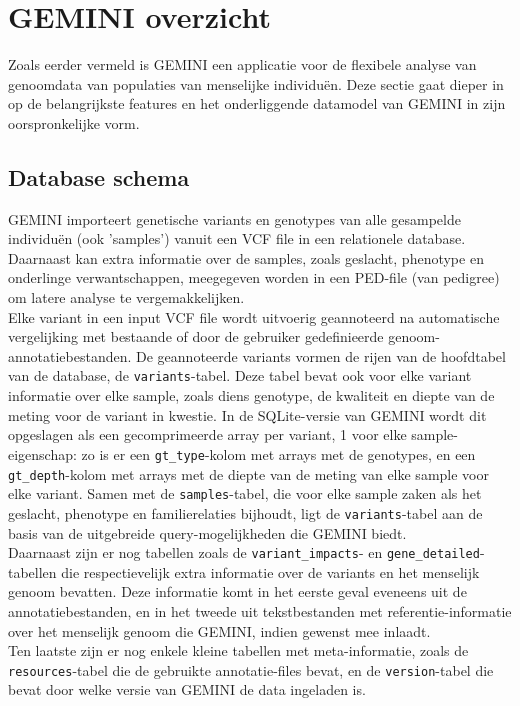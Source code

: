 \chapter{GEMINI overzicht}
\label{gemini_beschrijving}

Zoals eerder vermeld is GEMINI een applicatie voor de flexibele analyse van genoomdata van populaties van menselijke individu\"en. Deze sectie gaat dieper in op de belangrijkste features en het onderliggende datamodel van GEMINI in zijn oorspronkelijke vorm.\cite{10.1371/journal.pcbi.1003153}\cite{gemini_docs}

\section{Database schema}

GEMINI importeert genetische variants en genotypes van alle gesampelde individu\"en (ook 'samples') vanuit een VCF file in een relationele database.
Daarnaast kan extra informatie over de samples, zoals geslacht, phenotype en onderlinge verwantschappen, meegegeven worden in een PED-file (van pedigree) om latere analyse te vergemakkelijken.\\

Elke variant in een input VCF file wordt uitvoerig geannoteerd na automatische vergelijking met bestaande of door de gebruiker gedefinieerde genoom-annotatiebestanden. De geannoteerde variants vormen de rijen van de hoofdtabel van de database, de \texttt{variants}-tabel. Deze tabel bevat ook voor elke variant informatie over elke sample, zoals diens genotype, de kwaliteit en diepte van de meting voor de variant in kwestie. In de SQLite-versie van GEMINI wordt dit opgeslagen als een gecomprimeerde array per variant, 1 voor elke sample-eigenschap: zo is er een \texttt{gt\_type}-kolom met arrays met de genotypes, en een \texttt{gt\_depth}-kolom met arrays met de diepte van de meting van elke sample voor elke variant. Samen met de \texttt{samples}-tabel, die voor elke sample zaken als het geslacht, phenotype en familierelaties bijhoudt, ligt de \texttt{variants}-tabel aan de basis van de uitgebreide query-mogelijkheden die GEMINI biedt.\\

Daarnaast zijn er nog tabellen zoals de \texttt{variant\_impacts}- en \texttt{gene\_detailed}-tabellen die respectievelijk extra informatie over de variants en het menselijk genoom bevatten. Deze informatie komt in het eerste geval eveneens uit de annotatiebestanden, en in het tweede uit tekstbestanden met referentie-informatie over het menselijk genoom die GEMINI, indien gewenst mee inlaadt.\\
Ten laatste zijn er nog enkele kleine tabellen met meta-informatie, zoals de \texttt{resources}-tabel die de gebruikte annotatie-files bevat, en de \texttt{version}-tabel die bevat door welke versie van GEMINI de data ingeladen is.\\

